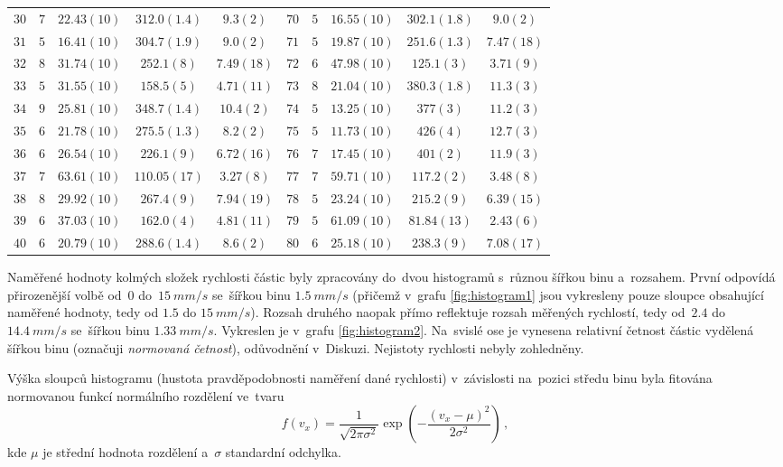 \documentclass{../concepts/titul_zprava_p/prepareprotokolZprava} %
\begin{document}
\begin{table}[!htbp]
\begin{tabular}{ccccc|ccccc}
 $30$ & $7$ & $22.43(10)$ & $312.0(1.4)$ & $9.3(2)$ & $70$ & $5$ & $16.55(10)$ & $302.1(1.8)$ & $9.0(2)$ \\
 $31$ & $5$ & $16.41(10)$ & $304.7(1.9)$ & $9.0(2)$ & $71$ & $5$ & $19.87(10)$ & $251.6(1.3)$ & $7.47(18)$ \\
 $32$ & $8$ & $31.74(10)$ & $252.1(8)$ & $7.49(18)$ & $72$ & $6$ & $47.98(10)$ & $125.1(3)$ & $3.71(9)$ \\
 $33$ & $5$ & $31.55(10)$ & $158.5(5)$ & $4.71(11)$ & $73$ & $8$ & $21.04(10)$ & $380.3(1.8)$ & $11.3(3)$ \\
 $34$ & $9$ & $25.81(10)$ & $348.7(1.4)$ & $10.4(2)$ & $74$ & $5$ & $13.25(10)$ & $377(3)$ & $11.2(3)$ \\
 $35$ & $6$ & $21.78(10)$ & $275.5(1.3)$ & $8.2(2)$ & $75$ & $5$ & $11.73(10)$ & $426(4)$ & $12.7(3)$ \\
 $36$ & $6$ & $26.54(10)$ & $226.1(9)$ & $6.72(16)$ & $76$ & $7$ & $17.45(10)$ & $401(2)$ & $11.9(3)$ \\
 $37$ & $7$ & $63.61(10)$ & $110.05(17)$ & $3.27(8)$ & $77$ & $7$ & $59.71(10)$ & $117.2(2)$ & $3.48(8)$ \\
 $38$ & $8$ & $29.92(10)$ & $267.4(9)$ & $7.94(19)$ & $78$ & $5$ & $23.24(10)$ & $215.2(9)$ & $6.39(15)$ \\
 $39$ & $6$ & $37.03(10)$ & $162.0(4)$ & $4.81(11)$ & $79$ & $5$ & $61.09(10)$ & $81.84(13)$ & $2.43(6)$ \\
 $40$ & $6$ & $20.79(10)$ & $288.6(1.4)$ & $8.6(2)$ & $80$ & $6$ & $25.18(10)$ & $238.3(9)$ & $7.08(17)$ \\
 \bottomrule
\end{tabular}
\label{tab:castice}
\end{table}

Naměřené hodnoty kolmých složek rychlosti částic byly zpracovány do~dvou histogramů s~různou šířkou binu a~rozsahem.
První odpovídá přirozenější volbě od~$0$ do~$\qty{15}{mm \per s}$ se~šířkou binu $\qty{1.5}{mm \per s}$ (přičemž v~grafu
\ref{fig:histogram1} jsou vykresleny pouze sloupce obsahující naměřené hodnoty, tedy od $1.5$ do $\qty{15}{mm \per s}$).
Rozsah druhého naopak přímo reflektuje rozsah měřených rychlostí, tedy od~$2.4$ do~$\qty{14.4}{mm \per s}$ se~šířkou binu 
$\qty{1.33}{mm \per s}$. Vykreslen je v~grafu \ref{fig:histogram2}. Na~svislé ose je vynesena relativní četnost částic
vydělená šířkou binu (označuji \textit{normovaná četnost}), odůvodnění v~Diskuzi. Nejistoty rychlosti nebyly zohledněny.

Výška sloupců histogramu (hustota pravděpodobnosti naměření dané rychlosti) v~závislosti na~pozici středu binu byla fitována 
normovanou funkcí normálního rozdělení ve~tvaru 
\begin{equation}
    \label{eq:gauss}
    f(v_x) = \frac{1}{\sqrt{2 \pi \sigma^2}} \exp \left( -\frac{(v_x - \mu)^2}{2 \sigma^2} \right) \,,
\end{equation}
kde $\mu$ je střední hodnota rozdělení a~$\sigma$ standardní odchylka. 
\end{document}
